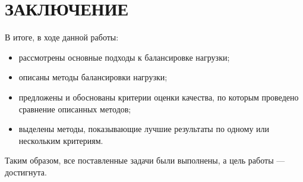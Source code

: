\section*{ЗАКЛЮЧЕНИЕ}


В итоге, в ходе данной работы:
\begin{itemize}
    \item рассмотрены основные подходы к балансировке нагрузки;
    \item описаны методы балансировки нагрузки;
    \item предложены и обоснованы критерии оценки качества, по которым проведено сравнение описанных методов;
    \item выделены методы, показывающие лучшие результаты по одному или нескольким критериям.
\end{itemize}

Таким образом, все поставленные задачи были выполнены, а цель работы --- достигнута.

